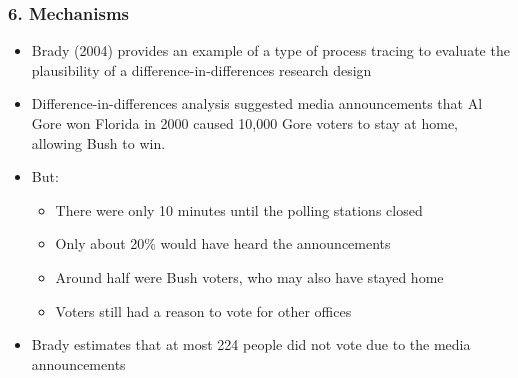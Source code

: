 \documentclass[xcolor=x11names,compress]{beamer}\usepackage[]{graphicx}\usepackage[]{xcolor}
\renewcommand{\(}{\begin{columns}}
\renewcommand{\)}{\end{columns}}
\newcommand{\<}[1]{\begin{column}{#1}}
\renewcommand{\>}{\end{column}}
\begin{document}
\begin{frame}
\frametitle{6. Mechanisms}
\begin{itemize}
\item Brady (2004) provides an example of a type of process tracing to evaluate the plausibility of a difference-in-differences research design
\pause
\item Difference-in-differences analysis suggested media announcements that Al Gore won Florida in 2000 caused 10,000 Gore voters to stay at home, allowing Bush to win.
\pause
\item But:
\pause
\begin{itemize}
\item There were only 10 minutes until the polling stations closed
\pause
\item Only about 20\% would have heard the announcements
\pause
\item Around half were Bush voters, who may also have stayed home
\pause
\item Voters still had a reason to vote for other offices
\pause
\end{itemize}
\item Brady estimates that at most 224 people did not vote due to the media announcements
\end{itemize}
\end{frame}
\end{document}
